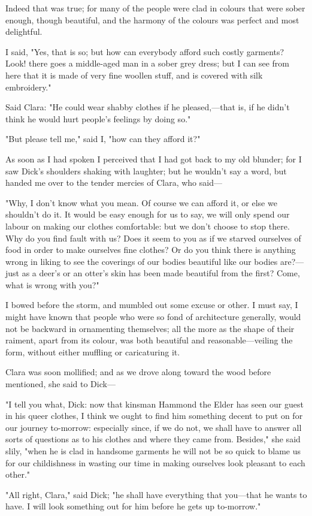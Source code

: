 Indeed that was true; for many of the people were clad in colours that
were sober enough, though beautiful, and the harmony of the colours was
perfect and most delightful.

I said, "Yes, that is so; but how can everybody afford such costly
garments? Look! there goes a middle-aged man in a sober grey dress; but
I can see from here that it is made of very fine woollen stuff, and is
covered with silk embroidery."

Said Clara: "He could wear shabby clothes if he pleased,---that is, if
he didn't think he would hurt people's feelings by doing so."

"But please tell me," said I, "how can they afford it?"

As soon as I had spoken I perceived that I had got back to my old
blunder; for I saw Dick's shoulders shaking with laughter; but he
wouldn't say a word, but handed me over to the tender mercies of Clara,
who said---

"Why, I don't know what you mean. Of course we can afford it, or else we
shouldn't do it. It would be easy enough for us to say, we will only
spend our labour on making our clothes comfortable: but we don't choose
to stop there. Why do you find fault with us? Does it seem to you as if
we starved ourselves of food in order to make ourselves fine clothes? Or
do you think there is anything wrong in liking to see the coverings of
our bodies beautiful like our bodies are?---just as a deer's or an
otter's skin has been made beautiful from the first? Come, what is wrong
with you?"

I bowed before the storm, and mumbled out some excuse or other. I must
say, I might have known that people who were so fond of architecture
generally, would not be backward in ornamenting themselves; all the more
as the shape of their raiment, apart from its colour, was both beautiful
and reasonable---veiling the form, without either muffling or
caricaturing it.

Clara was soon mollified; and as we drove along toward the wood before
mentioned, she said to Dick---

"I tell you what, Dick: now that kinsman Hammond the Elder has seen our
guest in his queer clothes, I think we ought to find him something
decent to put on for our journey to-morrow: especially since, if we do
not, we shall have to answer all sorts of questions as to his clothes
and where they came from. Besides," she said slily, "when he is clad in
handsome garments he will not be so quick to blame us for our
childishness in wasting our time in making ourselves look pleasant to
each other."

"All right, Clara," said Dick; "he shall have everything that you---that
he wants to have. I will look something out for him before he gets up
to-morrow."
